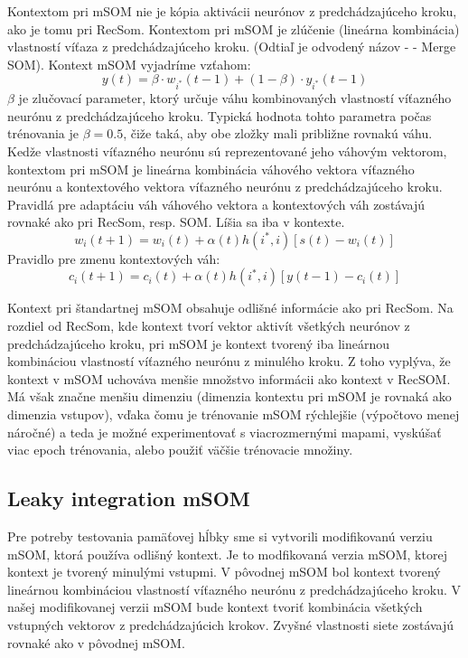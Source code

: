 Kontextom pri mSOM nie je kópia aktivácii neurónov z predchádzajúceho kroku, ako je tomu pri RecSom. 
Kontextom pri mSOM je zlúčenie (lineárna kombinácia) vlastností víťaza z predchádzajúceho kroku.
(Odtiaľ je odvodený názov -  - Merge SOM). 
Kontext mSOM vyjadríme vzťahom:
\begin{equation}
	y(t) = \beta \cdot w_{i^{*}}(t-1) + (1 - \beta) \cdot y_{i^{*}}(t-1)
\end{equation}
$\beta$ je zlučovací parameter, ktorý určuje váhu kombinovaných vlastností
víťazného neurónu z predchádzajúceho kroku. Typická hodnota tohto parametra
počas trénovania je $\beta = 0.5$, čiže taká, aby obe zložky mali približne 
rovnakú váhu. 
Kedže vlastnosti víťazného neurónu sú reprezentované jeho váhovým vektorom, 
kontextom pri mSOM je lineárna kombinácia váhového vektora víťazného neurónu a 
kontextového vektora víťazného neurónu z predchádzajúceho kroku.
Pravidlá pre adaptáciu váh váhového vektora a kontextových váh zostávajú rovnaké ako pri RecSom, resp. SOM. Líšia sa iba v kontexte.
\begin{equation}
	w_i(t + 1) = w_i(t) + \alpha(t)h(i^*, i)[s(t) - w_i(t)]
\end{equation}
Pravidlo pre zmenu kontextových váh:
\begin{equation}
	c_i(t + 1) = c_i(t) + \alpha(t)h(i^*, i)[y(t - 1) - c_i(t)]
\end{equation}

Kontext pri štandartnej mSOM obsahuje odlišné informácie ako pri RecSom.
Na rozdiel od RecSom, kde kontext tvorí vektor aktivít všetkých neurónov z predchádzajúceho kroku, pri
mSOM je kontext tvorený iba lineárnou kombináciou vlastností víťazného neurónu z minulého kroku. Z toho vyplýva, že
kontext v mSOM uchováva menšie množstvo informácii ako kontext v RecSOM.
Má však značne menšiu dimenziu (dimenzia kontextu pri mSOM je rovnaká ako dimenzia vstupov),
vďaka čomu je trénovanie mSOM rýchlejšie (výpočtovo menej náročné) a teda je možné experimentovať 
s viacrozmernými mapami, vyskúšať viac epoch trénovania, alebo použiť väčšie trénovacie množiny.

\subsection{Leaky integration mSOM}
Pre potreby testovania pamäťovej hĺbky sme si vytvorili modifikovanú verziu mSOM, 
ktorá používa odlišný kontext.
Je to modfikovaná verzia mSOM, ktorej kontext je tvorený minulými vstupmi.
V pôvodnej mSOM bol kontext tvorený lineárnou kombináciou vlastností víťazného neurónu z predchádzajúceho kroku.
V našej modifikovanej verzii mSOM bude kontext tvoriť kombinácia všetkých vstupných vektorov z predchádzajúcich krokov.
Zvyšné vlastnosti siete zostávajú rovnaké ako v pôvodnej mSOM. 

